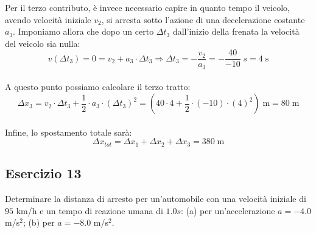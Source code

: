 \documentclass[12pt,a4paper]{book}
\begin{document}
Per il terzo contributo, è invece necessario capire in quanto tempo il veicolo, avendo velocità iniziale $v_2$, si arresta sotto l'azione di una decelerazione costante $a_3$. Imponiamo allora che dopo un certo $\Delta t_3$ dall'inizio della frenata la velocità del veicolo sia nulla:\\
\begin{equation*}
v(\Delta t_3) = 0 = v_2 + a_3 \cdot \Delta t_3 \Longrightarrow \Delta t_3 = - \frac{v_2}{a_3}= -\frac{40}{- 10} \; s = 4 \; \text{s}
\end{equation*}\\
A questo punto possiamo calcolare il terzo tratto:\\
\begin{equation*}
\Delta x_3 = v_2 \cdot \Delta t_3 + \frac{1}{2} \cdot a_3 \cdot (\Delta t_3)^2 = \left( 40 \cdot 4 + \frac{1}{2} \cdot (-10) \cdot (4)^2 \right) \; \text{m} = 80 \;\text{m}
\end{equation*}\\

Infine, lo spostamento totale sarà:\\
\begin{equation*}
\Delta x_{tot} = \Delta x_1 + \Delta x_2 + \Delta x_3 = 380 \; \text{m}
\end{equation*}


\subsection*{Esercizio 13}  
Determinare la distanza di arresto per un'automobile con una velocità iniziale di $95$ km/h e un tempo di reazione umana di $1.0 s$: (a) per un'accelerazione $a=-4.0$ m/s$^{2}$; (b) per $a=-8.0$ m/s$^{2}$.
\end{document}
